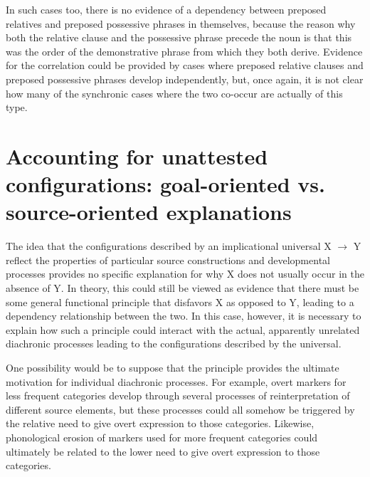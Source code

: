 \documentclass[output=paper]{langsci/langscibook}
\begin{document}
In such cases too, there is no evidence of a dependency
between preposed relatives and preposed possessive phrases in
themselves, because the reason why both the relative clause and the
possessive phrase precede the noun is that this was the order of the
demonstrative phrase from which they both derive. Evidence for the
correlation could be provided by cases where preposed relative clauses
and preposed possessive phrases develop independently, but, once again,
it is not clear how many of the synchronic cases where the two
co-occur are actually of this type.

\section{Accounting for unattested configurations: goal-oriented
  vs. source-oriented explanations}

\largerpage
The idea that the configurations described by an implicational
universal  X $\rightarrow$ Y reflect the properties of particular
source constructions and developmental processes provides no specific
explanation for why X does not usually occur in the absence of Y. In
theory, this could still be viewed as evidence that there must be
some general functional principle  that disfavors X as opposed to Y,
leading to a dependency relationship between the two. In this case,
however, it is necessary to explain how such a principle could interact
with the actual, apparently unrelated diachronic processes  leading to the configurations described by the
universal.


One possibility would be to suppose that the
principle provides the ultimate motivation for individual diachronic
processes. For example, overt markers for less frequent categories
develop through several processes of reinterpretation of different
source elements, but these processes 
could all somehow be triggered by the relative need to give overt
expression to those categories. Likewise, phonological erosion  of 
markers used for more frequent categories could ultimately be
related to the lower need to give overt expression to those
categories.  
\end{document}
